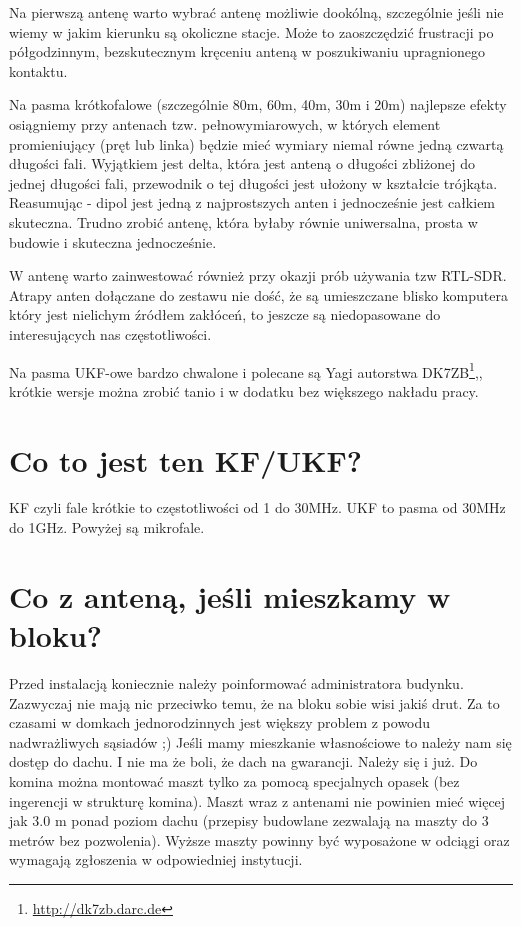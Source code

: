 \documentclass[a4paper,12pt]{article}
\begin{document}
Na pierwszą antenę warto wybrać antenę możliwie dookólną, szczególnie jeśli nie wiemy w jakim kierunku są okoliczne stacje. Może to zaoszczędzić frustracji po półgodzinnym, bezskutecznym kręceniu anteną w poszukiwaniu upragnionego kontaktu.

Na pasma krótkofalowe (szczególnie 80m, 60m, 40m, 30m i 20m) najlepsze efekty osiągniemy przy antenach tzw. pełnowymiarowych, w których element promieniujący (pręt lub linka) będzie mieć wymiary niemal równe jedną czwartą długości fali. Wyjątkiem jest delta, która jest anteną o długości zbliżonej do jednej długości fali, przewodnik o tej długości jest ułożony w kształcie trójkąta. Reasumując - dipol jest jedną z najprostszych anten i jednocześnie jest całkiem skuteczna. Trudno zrobić antenę, która byłaby równie uniwersalna, prosta w budowie i skuteczna jednocześnie.

W antenę warto zainwestować również przy okazji prób używania tzw RTL-SDR. Atrapy anten dołączane do zestawu nie dość, że są umieszczane blisko komputera który jest nielichym źródłem zakłóceń, to jeszcze są niedopasowane do interesujących nas częstotliwości.

Na pasma UKF-owe bardzo chwalone i polecane są Yagi autorstwa DK7ZB\footnote{\url{http://dk7zb.darc.de}},, krótkie wersje można zrobić tanio i w dodatku bez większego nakładu pracy.

\section{Co to jest ten KF/UKF?}
KF czyli fale krótkie to częstotliwości od 1 do 30MHz.
UKF to pasma od 30MHz do 1GHz.
Powyżej są mikrofale.

\section{Co z anteną, jeśli mieszkamy w bloku?}
Przed instalacją koniecznie należy poinformować administratora budynku. Zazwyczaj nie mają nic przeciwko temu, że na bloku sobie wisi jakiś drut. Za to czasami w domkach jednorodzinnych jest większy problem z powodu nadwrażliwych sąsiadów ;)
Jeśli mamy mieszkanie własnościowe to należy nam się dostęp do dachu. I nie ma że boli, że dach na gwarancji. Należy się i już.
Do komina można montować maszt tylko za pomocą specjalnych opasek (bez ingerencji w strukturę komina). Maszt wraz z antenami nie powinien mieć więcej jak 3.0 m ponad poziom dachu (przepisy budowlane zezwalają na maszty do 3 metrów bez pozwolenia). Wyższe maszty powinny być wyposażone w odciągi oraz wymagają zgłoszenia w odpowiedniej instytucji.
\end{document}
